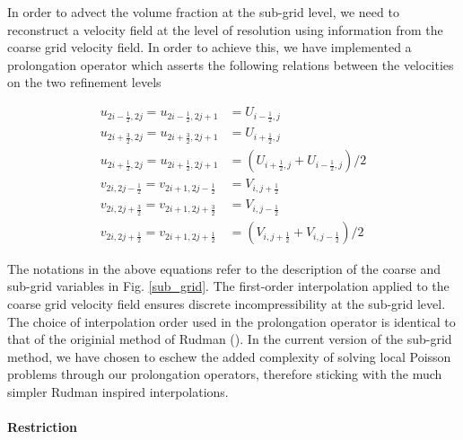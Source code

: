 In order to advect the volume fraction at the sub-grid level, 
we need to reconstruct a velocity field at the level of resolution using 
information from the coarse grid velocity field.
In order to achieve this, we have implemented a prolongation operator 
which asserts the following relations between the velocities on the two refinement levels  

\begin{align}
  	  u_{2i-\frac{1}{2},2j} = u_{2i-\frac{1}{2},2j+1} &= U_{i-\frac{1}{2},j} \\ 
            u_{2i+\frac{3}{2},2j} = u_{2i+\frac{3}{2},2j+1} &= U_{i+\frac{1}{2},j} \\ 
  	  u_{2i+\frac{1}{2},2j} = u_{2i+\frac{1}{2},2j+1} &= \left(U_{i+\frac{1}{2},j} + U_{i-\frac{1}{2},j}\right) / 2 \\
  	  v_{2i,2j-\frac{1}{2}} = v_{2i+1,2j-\frac{1}{2}} &= V_{i,j+\frac{1}{2}} \\ 
            v_{2i,2j+\frac{3}{2}} = v_{2i+1,2j+\frac{3}{2}} &= V_{i,j-\frac{1}{2}} \\
  	  v_{2i,2j+\frac{1}{2}} = v_{2i+1,2j+\frac{1}{2}} &= \left(V_{i,j+\frac{1}{2}} + V_{i,j-\frac{1}{2}}\right) / 2 
\end{align}


The notations in the above equations refer to the description 
of the coarse and sub-grid variables in Fig. \ref{sub_grid}. 
The first-order interpolation applied to the coarse grid 
velocity field ensures discrete incompressibility 
at the sub-grid level.
The choice of interpolation order used in the  prolongation operator 
is identical to that of the originial method of Rudman (\cite{rudman1998volume}). 
In the current version of the sub-grid method, we have chosen to eschew the added 
complexity of solving local Poisson problems 
through our prolongation operators, therefore sticking with 
the much simpler Rudman inspired interpolations. 


\paragraph{\textbf{Restriction}}


